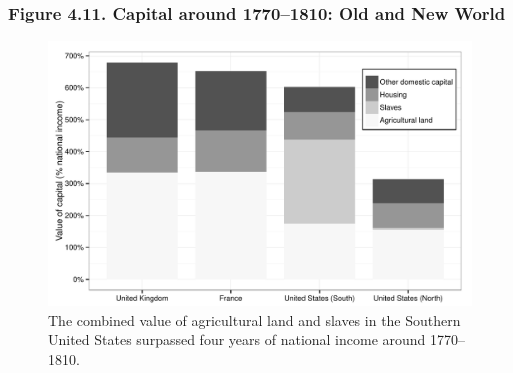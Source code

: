 \documentclass[t]{beamer}\usepackage[]{graphicx}\usepackage[]{color}
\newenvironment{knitrout}{}{} %
\begin{document}
\begin{frame}[label=Figure_4_11]
\frametitle{Figure 4.11. Capital around 1770--1810: Old and New World}
\begin{figure}[t]
\begin{minipage}[b]{\textwidth}
\centering
\begin{knitrout}\footnotesize
{}\color{fgcolor}

{\centering \includegraphics[width=1\linewidth]{figures/bw/Figure_4_11} 

}



\end{knitrout}
\caption{The combined value of agricultural land and slaves in the Southern United States surpassed four years of national income around 1770--1810.}
\end{minipage}
\end{figure}
\end{frame}
\end{document}

